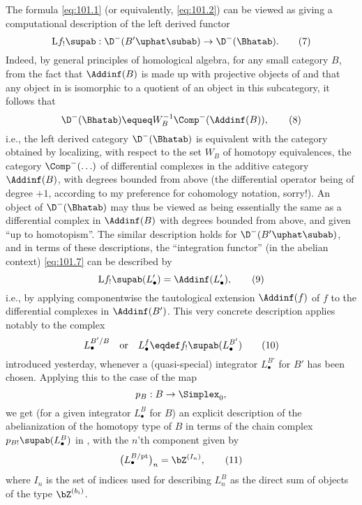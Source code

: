 The formula \eqref{eq:101.1} (or equivalently, \eqref{eq:101.2}) can
be viewed as giving a computational description of the left derived
functor
\begin{equation}
  \label{eq:101.7}
  \mathrm Lf_!\supab:\D^-({B'}\uphat\subab)\to \D^-(\Bhatab).\tag{7}
\end{equation}
Indeed, by general principles of homological algebra, for
any small category $B$, from the fact that $\Addinf(B)$ is made up
with projective objects of \Bhatab{} and that any object in \Bhatab{}
is isomorphic to a quotient of an object in this subcategory, it
follows that
\begin{equation}
  \label{eq:101.8}
  \D^-(\Bhatab)\equeq W_B^{-1}\Comp^-(\Addinf(B)),\tag{8}
\end{equation}
i.e., the left derived category $\D^-(\Bhatab)$ is equivalent with the
category obtained by localizing, with respect to the set $W_B$ of
homotopy equivalences, the category $\Comp^-(\ldots)$ of differential
complexes in the additive category $\Addinf(B)$, with degrees bounded
from above (the differential operator being of degree $+1$, according
to my preference for cohomology notation, sorry!). An object of
$\D^-(\Bhatab)$ may thus be viewed as being essentially the same as a
differential complex in $\Addinf(B)$ with degrees bounded from above,
and given ``up to homotopism''.  The similar description holds for
$\D^-({B'}\uphat\subab)$, and in terms of these descriptions, the
``integration functor'' (in the abelian context) \eqref{eq:101.7} can
be described by
\begin{equation}
  \label{eq:101.9}
  \mathrm Lf_!\supab(L_\bullet') = \Addinf(L_\bullet'),\tag{9}
\end{equation}
i.e., by applying componentwise the tautological extension
$\Addinf(f)$ of $f$ to the differential complexes in
$\Addinf(B')$. This very concrete description applies notably to the
complex
\begin{equation}
  \label{eq:101.10}
  L_\bullet^{B'/B}\quad\text{or}\quad L_\bullet^f\eqdef f_!\supab(L_\bullet^{B'})\tag{10}
\end{equation}
introduced yesterday, whenever a (quasi-special) integrator
$L_\bullet^{B'}$ for $B'$ has been chosen. Applying this to the case
of the map
\[p_B:B\to\Simplex_0,\]
we get (for a given integrator $L_\bullet^B$ for $B$) an explicit
description of the abelianization of the homotopy type of $B$ in terms
of the chain complex $p_{B!}\supab(L_\bullet^B)$ in \Ab, with the
$n$'th component given by
\begin{equation}
  \label{eq:101.11}
  \bigl(L_\bullet^{B/\mathrm{pt}}\bigr)_n = \bZ^{(I_n)},\tag{11}
\end{equation}
where $I_n$ is the set of indices used for describing $L_n^B$ as the
direct sum of objects of the type $\bZ^{(b_i)}$.

